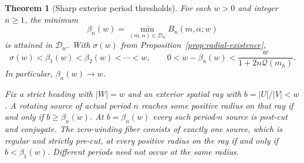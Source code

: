 \documentclass[11pt,a4paper]{article}
\newtheorem{theorem}{Theorem}[section]
\theoremstyle{remark}\newtheorem{remark}[theorem]{Remark}
\begin{document}
\begin{theorem}[Sharp exterior period thresholds]
\label{thm:exterior-thresholds}
For each $w>0$ and integer $n\ge1$, the minimum
\begin{equation}\label{eq:angular-threshold}
 \beta_n(w)=\min_{(m,\alpha)\in\mathcal D_w}B_n(m,\alpha;w)
\end{equation}
is attained in $\mathcal D_w$. With $\sigma(w)$ from
Proposition~\ref{prop:radial-existence},
\begin{equation}\label{eq:angular-hierarchy}
 \sigma(w)<\beta_1(w)<\beta_2(w)<\cdots<w,\qquad
 0<w-\beta_n(w)<\frac{w}{1+2n\mathcal Q(m_h)}.
\end{equation}
In particular, $\beta_n(w)\to w$.

Fix a strict heading with $|W|=w$ and an exterior spatial ray with
$b=|U|/|V|<w$. A rotating source of actual period $n$ reaches some
positive radius on that ray if and only if $b\ge\beta_n(w)$.
At $b=\beta_n(w)$ every such period-$n$ source is post-cut and conjugate.
The zero-winding fiber consists of exactly one source, which is regular
and strictly pre-cut, at every positive radius on the ray if and only if
$b<\beta_1(w)$.
Different periods need not occur at the same radius.
\end{theorem}
\end{document}

